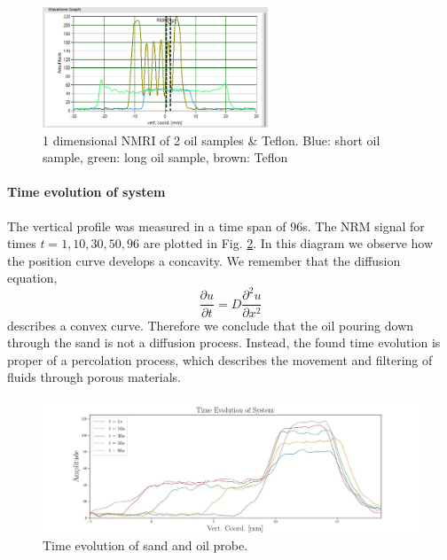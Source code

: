 \begin{figure}[!htbp]
  \begin{center}
    \includegraphics[width= 0.6\textwidth]{./Protocol images/III/three_profiles.png}
 \caption{1 dimensional NMRI of 2 oil samples \& Teflon. Blue: short oil sample, green: long oil sample, brown: Teflon}
    \label{fig:teflon}
   \end{center}
 \end{figure} 
\paragraph{Time evolution of system}
The vertical profile was measured in a time span of 96s. The NRM signal for times $t = 1,10, 30, 50, 96$ are plotted in Fig. \ref{fig:time evolution system}. In this diagram we observe how the position curve develops a concavity. We remember that the diffusion equation,
\begin{equation}
\frac{\partial u}{\partial t} = D\frac{\partial^2 u}{\partial x^2}
\end{equation}
describes a convex curve. Therefore we conclude that the oil pouring down through the sand is not a diffusion process. Instead, the found time evolution is proper of a percolation process, which describes the movement and filtering of fluids through porous materials. 
\begin{figure}[!htbp]
  \begin{center}
    \includegraphics[width= 1.0\textwidth]{./Latex images/time_evolution.jpg}
 \caption{Time evolution of sand and oil probe.}
    \label{fig:time evolution system}
   \end{center}
 \end{figure}
